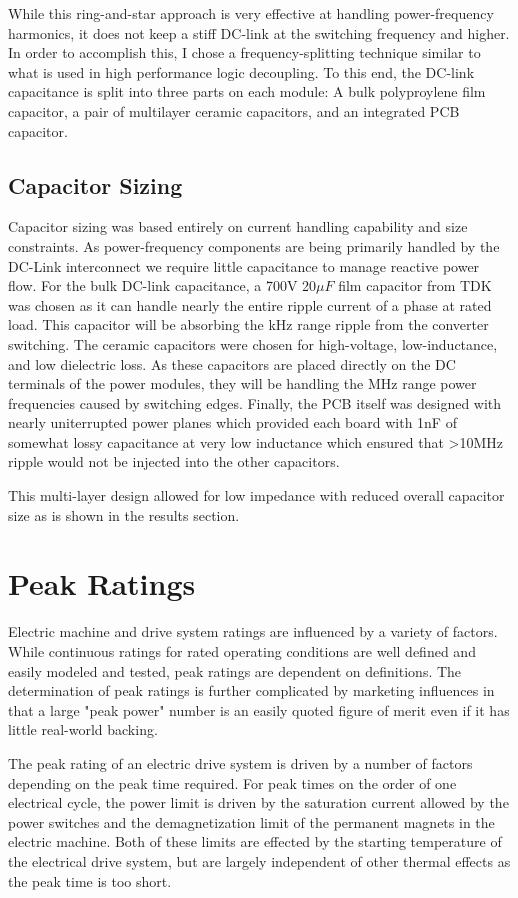 While this ring-and-star approach is very effective at handling
power-frequency harmonics, it does not keep a stiff DC-link at the switching
frequency and higher.
In order to accomplish this, I chose a frequency-splitting technique similar
to what is used in high performance logic decoupling.
To this end, the DC-link capacitance is split into three parts on each module:
A bulk polyproylene film capacitor, a pair of multilayer ceramic capacitors,
and an integrated PCB capacitor.


\subsection{Capacitor Sizing}
Capacitor sizing was based entirely on current handling capability and size
constraints.
As power-frequency components are being primarily handled by the DC-Link
interconnect we require little capacitance to manage reactive power flow.
For the bulk DC-link capacitance, a 700V 20$\mu F$ film capacitor from TDK was
chosen as it can handle nearly the entire ripple current of a phase at rated
load.
This capacitor will be absorbing the kHz range ripple from the converter
switching.
The ceramic capacitors were chosen for high-voltage, low-inductance, and low
dielectric loss.
As these capacitors are placed directly on the DC terminals of the power
modules, they will be handling the MHz range power frequencies caused by
switching edges.
Finally, the PCB itself was designed with nearly uniterrupted power planes
which provided each board with 1nF of somewhat lossy capacitance at very low
inductance which ensured that >10MHz ripple would not be injected into the
other capacitors.

This multi-layer design allowed for low impedance with reduced overall
capacitor size as is shown in the results section.


\section{Peak Ratings}
Electric machine and drive system ratings are influenced by a variety of
factors.
While continuous ratings for rated operating conditions are well defined and
easily modeled and tested, peak ratings are dependent on definitions.
The determination of peak ratings is further complicated by marketing
influences in that a large "peak power" number is an easily quoted figure of
merit even if it has little real-world backing.

The peak rating of an electric drive system is driven by a number of factors
depending on the peak time required.
For peak times on the order of one electrical cycle, the power limit is driven
by the saturation current allowed by the power switches and the
demagnetization limit of the permanent magnets in the electric machine.
Both of these limits are effected by the starting temperature of the
electrical drive system, but are largely independent of other thermal effects
as the peak time is too short.

